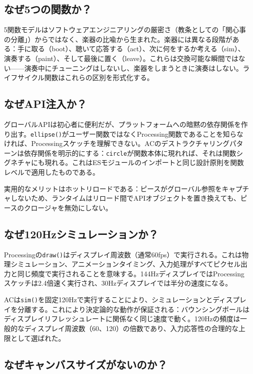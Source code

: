 \documentclass[10pt,letterpaper,twocolumn]{article}
\begin{document}
\subsection{なぜ5つの関数か？}

5関数モデルはソフトウェアエンジニアリングの厳密さ（教条としての「関心事の分離」）からではなく、楽器の比喩から生まれた。楽器には異なる段階がある：手に取る（boot）、聴いて応答する（act）、次に何をするか考える（sim）、演奏する（paint）、そして最後に置く（leave）。これらは交換可能な瞬間ではない——演奏中にチューニングはしないし、楽器をしまうときに演奏はしない。ライフサイクル関数はこれらの区別を形式化する。

\subsection{なぜAPI注入か？}

グローバルAPIは初心者に便利だが、プラットフォームへの暗黙の依存関係を作り出す。\texttt{ellipse()}がユーザー関数ではなくProcessing関数であることを知らなければ、Processingスケッチを理解できない。ACのデストラクチャリングパターンは依存関係を明示的にする：\texttt{circle}が関数本体に現れれば、それは関数シグネチャにも現れる。これはESモジュールのインポートと同じ設計原則を関数レベルで適用したものである。

実用的なメリットはホットリロードである：ピースがグローバル参照をキャプチャしないため、ランタイムはリロード間でAPIオブジェクトを置き換えても、ピースのクロージャを無効にしない。

\subsection{なぜ120Hzシミュレーションか？}

Processingの\texttt{draw()}はディスプレイ周波数（通常60fps）で実行される。これは物理シミュレーション、アニメーションタイミング、入力処理がすべてピクセル出力と同じ頻度で実行されることを意味する。144HzディスプレイではProcessingスケッチは2.4倍速く実行され、30Hzディスプレイでは半分の速度になる。

ACは\texttt{sim()}を固定120Hzで実行することにより、シミュレーションとディスプレイを分離する。これにより決定論的な動作が保証される：バウンシングボールはディスプレイリフレッシュレートに関係なく同じ速度で動く。120Hzの頻度は一般的なディスプレイ周波数（60、120）の倍数であり、入力応答性の合理的な上限として選ばれた。

\subsection{なぜキャンバスサイズがないのか？}
\end{document}
